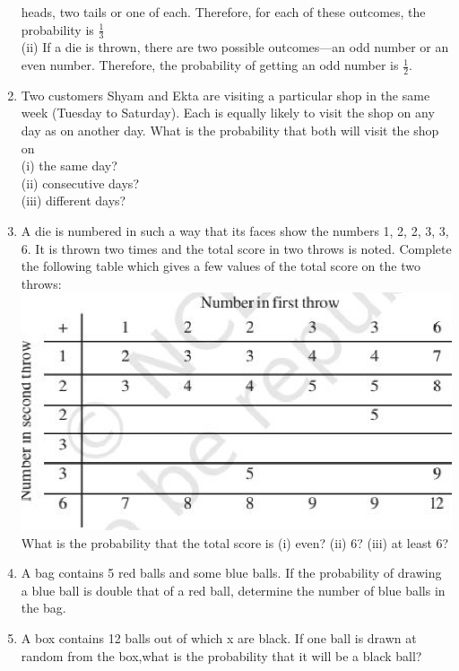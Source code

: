 \begin{enumerate}[label=\arabic*.,ref=\thesubsection.\theenumi]
heads, two tails or one of each. Therefore, for each of these outcomes, the
probability is $\frac{1}{3}$ \\
(ii) If a die is thrown, there are two possible outcomes—an odd number or an even
number. Therefore, the probability of getting an odd number is $\frac{1}{2}$.
\\
\solution

\item Two customers Shyam and Ekta are visiting a particular shop in the same week (Tuesday
to Saturday). Each is equally likely to visit the shop on any day as on another day. What
is the probability that both will visit the shop on\\
(i) the same day?\\
(ii) consecutive days?\\
(iii) different days?
\\
\solution

\item A die is numbered in such a way that its faces show the numbers 1, 2, 2, 3, 3, 6. It is thrown two times and the total score in two throws is noted. Complete the following
table which gives a few values of the total score on the two throws:
\includegraphics[width=\columnwidth]{./prob/figs/rows.eps}\\
What is the probability that the total score is
(i) even? (ii) 6? (iii) at least 6?
\\
\solution

\item A bag contains 5 red balls and some blue balls. If the probability of drawing a blue ball is double that of a red ball, determine the number of blue balls in the bag.
\\
\solution

\item A box contains 12 balls out of which x are black. If one ball is drawn at random from the box,what is the probability that it will be a black ball?\\

\end{enumerate}
